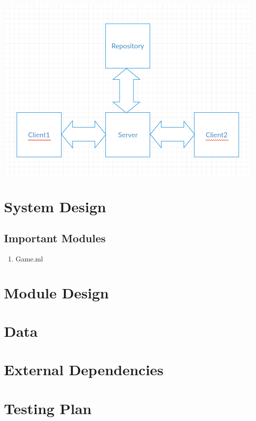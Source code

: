 \documentclass{scrreprt}
\begin{document}
	\includegraphics{C&C.png}

\chapter{System Design}
\section{Important Modules}

\begin{enumerate}
	\item Game.ml
\end{enumerate}
\chapter{Module Design}
\chapter{Data}
\chapter{External Dependencies}
\chapter{Testing Plan}

\end{document}
